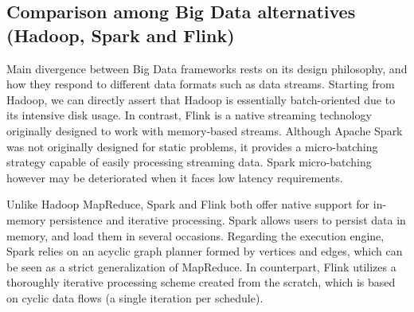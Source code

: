 \documentclass[3p,review]{elsarticle}
\begin{document}
	
	\subsection{Comparison among Big Data alternatives (Hadoop, Spark and Flink)}\label{subsec:spark}
	
	Main divergence between Big Data frameworks rests on its design philosophy, and how they respond to different data formats such as data streams. Starting from Hadoop, we can directly assert that Hadoop is essentially batch-oriented due to its intensive disk usage. In contrast, Flink is a native streaming technology originally designed to work with memory-based streams. Although Apache Spark was not originally designed for static problems, it provides a micro-batching strategy capable of easily processing streaming data. Spark micro-batching however may be deteriorated when it faces low latency requirements. %
	
	Unlike Hadoop MapReduce, Spark and Flink both offer native support for in-memory persistence and iterative processing. Spark allows users to persist data in memory, and load them in several occasions. Regarding the execution engine, Spark relies on an acyclic graph planner formed by vertices and edges, which can be seen as a strict generalization of MapReduce. In counterpart, Flink utilizes a thoroughly iterative processing scheme created from the scratch, which is based on cyclic data flows (a single iteration per schedule). %
	
	
\end{document}
